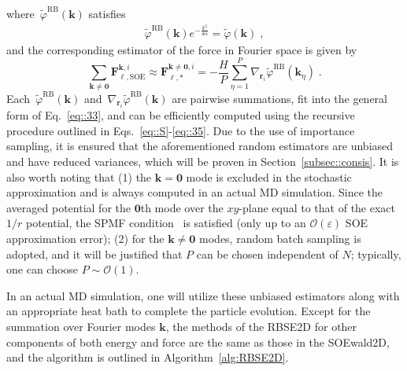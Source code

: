 where~$\widetilde{\varphi}^{\text{RB}}({\bm{k}})$ satisfies
\begin{equation}
	\begin{split}
		\widetilde{\varphi}^{\text{RB}}({\bm{k}}) e^{ - \frac{k^2}{4\alpha}} = \widetilde{\varphi}({\bm{k}}) \;,
	\end{split}
\end{equation}
and the corresponding estimator of the force in Fourier space is given by
\begin{equation}
	\sum_{\bm{k}\neq\bm{0}}\bm{F}_{\ell,\text{SOE}}^{\bm{k},i}\approx \bm{F}_{\ell,*}^{\bm{k}\neq\bm{0},i}=-\frac{H}{P} \sum_{\eta=1}^{P}\nabla_{\bm{r}_{i}}\widetilde{\varphi}^{\text{RB}}(\bm{k}_{\eta})\;.
\end{equation}
Each~$\widetilde{\varphi}^{\text{RB}}({\bm{k}})$ and~$\nabla_{\bm{r}_{i}}\widetilde{\varphi}^{\text{RB}}(\bm{k})$ are pairwise summations, fit into the general form of Eq.~\eqref{eq::33}, and can be efficiently computed using the recursive procedure outlined in Eqs.~\eqref{eq::S}-\eqref{eq::35}. 
Due to the use of importance sampling, it is ensured that the aforementioned random estimators are unbiased and have reduced variances, which will be proven in Section~\ref{subsec::consis}.
It is also worth noting that (1) the $\bm k=\bm 0$ mode is excluded in the stochastic approximation and is always computed in an actual MD simulation. Since the averaged potential for the $\bm 0$th mode over the $xy$-plane equal to that of the exact $1/r$ potential, the SPMF condition~\cite{hu2014symmetry} is satisfied (only up to an $\mathcal O(\varepsilon)$ SOE approximation error); (2) for the  $\bm k\neq \bm 0$ modes, random batch sampling is adopted, and it will be justified that $P$ can be chosen independent of $N$; typically, one can choose $P\sim \mathcal O(1)$.


In an actual MD simulation, one will utilize these unbiased estimators along with an appropriate heat bath to complete the particle evolution.  
Except for the summation over Fourier modes $\bm{k}$, the methods of the RBSE2D for other components of both energy and force are the same as those in the SOEwald2D, and the algorithm is outlined in Algorithm~\ref{alg:RBSE2D}.

